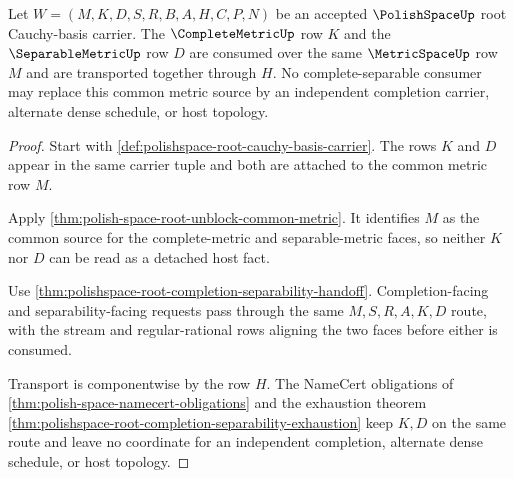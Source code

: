 \begin{theorem}
\label{thm:polishspace-complete-separable-route}
Let $W=(M,K,D,S,R,B,A,H,C,P,N)$ be an accepted $\PolishSpaceUp$ root Cauchy-basis carrier. The $\CompleteMetricUp$ row $K$ and the $\SeparableMetricUp$ row $D$ are consumed over the same $\MetricSpaceUp$ row $M$ and are transported together through $H$. No complete-separable consumer may replace this common metric source by an independent completion carrier, alternate dense schedule, or host topology.
\end{theorem}
\begin{proof}
Start with \autoref{def:polishspace-root-cauchy-basis-carrier}. The rows $K$ and $D$ appear in the same carrier tuple and both are attached to the common metric row $M$.

Apply \autoref{thm:polish-space-root-unblock-common-metric}. It identifies $M$ as the common source for the complete-metric and separable-metric faces, so neither $K$ nor $D$ can be read as a detached host fact.

Use \autoref{thm:polishspace-root-completion-separability-handoff}. Completion-facing and separability-facing requests pass through the same $M,S,R,A,K,D$ route, with the stream and regular-rational rows aligning the two faces before either is consumed.

Transport is componentwise by the row $H$. The NameCert obligations of \autoref{thm:polish-space-namecert-obligations} and the exhaustion theorem \autoref{thm:polishspace-root-completion-separability-exhaustion} keep $K,D$ on the same route and leave no coordinate for an independent completion, alternate dense schedule, or host topology.
\end{proof}

